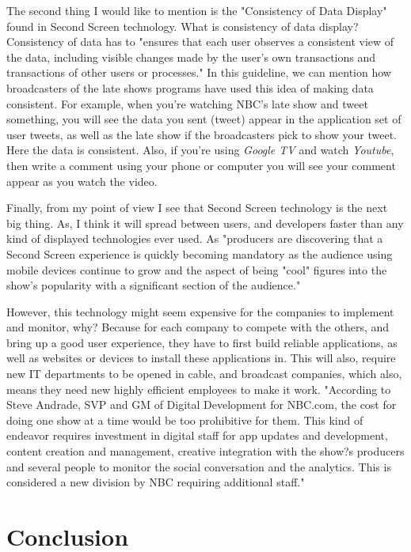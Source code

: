 \documentclass[12pt, oneside]{amsart}   	%
\begin{document}
 The second thing I would like to mention is the "Consistency of Data Display" found in Second Screen technology.  What is consistency of data display?   Consistency of data has to "ensures that each user observes a consistent view of the data, including visible changes made by the user's own transactions and transactions of other users or processes."\cite{guidline2}
In this guideline, we can mention how broadcasters of the late shows programs have used this idea of making data consistent.  For example, when you're watching NBC's late show and tweet something, you will see the data you sent (tweet) appear in the application set of user tweets, as well as the late show if the broadcasters pick to show your tweet.  Here the data is consistent.  Also, if you're using  \emph{Google TV} and watch  \emph{Youtube}, then write a comment using your phone or computer you will see your comment appear as you watch the video.


Finally, from my point of view I see that Second Screen technology is the next big thing.  As, I think it will spread between users, and developers faster than any kind of displayed technologies ever used. As "producers are discovering that a Second Screen experience is quickly becoming mandatory as the audience using mobile devices continue to grow and the aspect of being "cool" figures into the show's popularity with a significant section of the audience."\cite{Second-Screen-Art}

 However, this technology might seem expensive for the companies to implement and monitor, why?  Because for each company to compete with the others, and bring up a good user experience, they have to first build reliable applications, as well as websites or devices to install these applications in.  This will also, require new IT departments to be opened in cable, and broadcast companies, which also, means they need new highly efficient employees to make it work.  "According to Steve Andrade, SVP and GM of Digital Development for NBC.com, the cost for doing one show at a time would be too prohibitive for them. This kind of endeavor requires investment in digital staff for app updates and development, content creation and management, creative integration with the show?s producers and several people to monitor the social conversation and the analytics. This is considered a new division by NBC requiring additional staff." \cite{Second-Screen-Art}

 \section{Conclusion}
\end{document}
